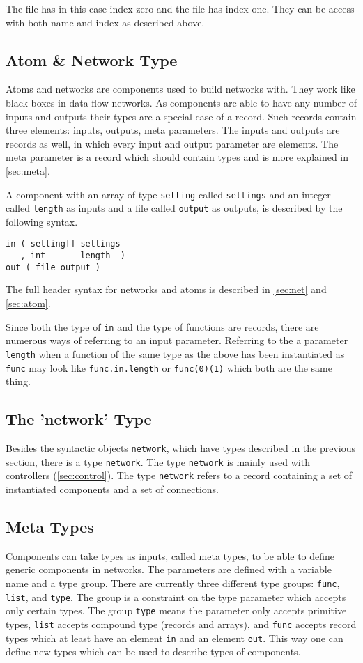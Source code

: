The file has in this case index zero and the file has index one. They
can be access with both name and index as described above.


\subsection{Atom \& Network Type}\label{sec:atomnet}
Atoms and networks are components used to build networks with. They
work like black boxes in data-flow networks. As components are able to
have any number of inputs and outputs their types are a special case
of a record. Such records contain three elements: inputs, outputs,
meta parameters. The inputs and outputs are records as well, in which
every input and output parameter are elements. The meta parameter is a
record which should contain types and is more explained in
\autoref{sec:meta}.

A component with an array of type \verb#setting# called
\verb#settings# and an integer called \verb#length# as inputs and a
file called \verb#output# as outputs, is described by the following
syntax.

\begin{verbatim}
in ( setting[] settings
   , int       length  )
out ( file output )
\end{verbatim}

The full header syntax for networks and atoms is described in
\autoref{sec:net} and \autoref{sec:atom}.

Since both the type of \verb#in# and the type of functions are
records, there are numerous ways of referring to an input
parameter. Referring to the a parameter \verb#length# when a function
of the same type as the above has been instantiated as \verb#func# may
look like \verb#func.in.length# or \verb#func(0)(1)# which both are
the same thing.


\subsection{The 'network' Type}
Besides the syntactic objects \verb#network#, which have types
described in the previous section, there is a type \verb#network#. The
type \verb#network# is mainly used with controllers
(\autoref{sec:control}). The type \verb#network# refers to a record
containing a set of instantiated components and a set of connections.


\subsection{Meta Types}\label{sec:meta}
Components can take types as inputs, called meta types, to be able to
define generic components in networks. The parameters are defined with
a variable name and a type group. There are currently three different
type groups: \verb#func#, \verb#list#, and \verb#type#. The group is a
constraint on the type parameter which accepts only certain types. The
group \verb#type# means the parameter only accepts primitive types,
\verb#list# accepts compound type (records and arrays), and
\verb#func# accepts record types which at least have an element
\verb#in# and an element \verb#out#. This way one can define new types
which can be used to describe types of components.

